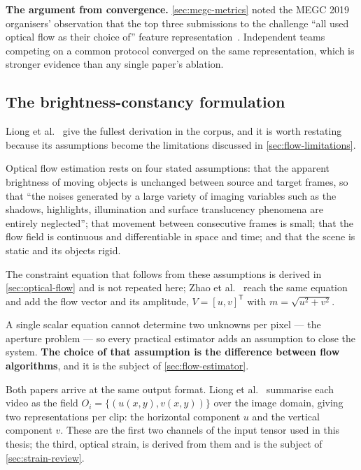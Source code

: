 \textbf{The argument from convergence.} \autoref{sec:megc-metrics} noted the MEGC 2019 organisers' observation that the top three submissions to the challenge ``all used optical flow as their choice of'' feature representation~\cite{see2019}. Independent teams competing on a common protocol converged on the same representation, which is stronger evidence than any single paper's ablation.

\subsection{The brightness-constancy formulation}
\label{sec:brightness-constancy}

Liong et al.~\cite{liong2019a} give the fullest derivation in the corpus, and it is worth restating because its assumptions become the limitations discussed in \autoref{sec:flow-limitations}.

Optical flow estimation rests on four stated assumptions: that the apparent brightness of moving objects is unchanged between source and target frames, so that ``the noises generated by a large variety of imaging variables such as the shadows, highlights, illumination and surface translucency phenomena are entirely neglected''; that movement between consecutive frames is small; that the flow field is continuous and differentiable in space and time; and that the scene is static and its objects rigid.

The constraint equation that follows from these assumptions is derived in \autoref{sec:optical-flow} and is not repeated here; Zhao et al.~\cite{zhaoS2021} reach the same equation and add the flow vector and its amplitude, $V = [u, v]^{\mathsf T}$ with $m = \sqrt{u^2 + v^2}$.

A single scalar equation cannot determine two unknowns per pixel --- the aperture problem --- so every practical estimator adds an assumption to close the system. \textbf{The choice of that assumption is the difference between flow algorithms}, and it is the subject of \autoref{sec:flow-estimator}.

Both papers arrive at the same output format. Liong et al.~\cite{liong2019a} summarise each video as the field $O_i = \{(u(x,y), v(x,y))\}$ over the image domain, giving two representations per clip: the horizontal component $u$ and the vertical component $v$. These are the first two channels of the input tensor used in this thesis; the third, optical strain, is derived from them and is the subject of \autoref{sec:strain-review}.

